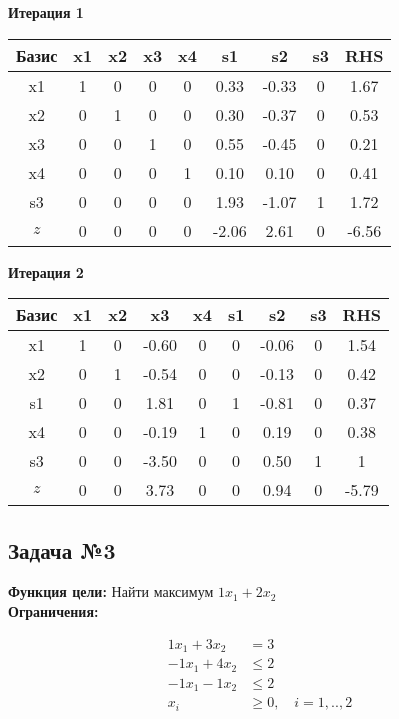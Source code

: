 \documentclass[a4paper,12pt]{article}
\begin{document}
 \textbf{Итерация 1}\\
\begin{tabular}{|c|c|c|c|c|c|c|c|c|}
\hline
Базис & x1 & x2 & x3 & x4 & s1 & s2 & s3 & RHS \\ \hline
x1 & 1 & 0 & 0 & 0 & 0.33 & -0.33 & 0 & 1.67 \\ \hline
x2 & 0 & 1 & 0 & 0 & 0.30 & -0.37 & 0 & 0.53 \\ \hline
x3 & 0 & 0 & 1 & 0 & 0.55 & -0.45 & 0 & 0.21 \\ \hline
x4 & 0 & 0 & 0 & 1 & 0.10 & 0.10 & 0 & 0.41 \\ \hline
s3 & 0 & 0 & 0 & 0 & 1.93 & -1.07 & 1 & 1.72 \\ \hline
$z$ & 0 & 0 & 0 & 0 & -2.06 & 2.61 & 0 & -6.56 \\ \hline
\end{tabular}
\vspace{5mm}

 \textbf{Итерация 2}\\
\begin{tabular}{|c|c|c|c|c|c|c|c|c|}
\hline
Базис & x1 & x2 & x3 & x4 & s1 & s2 & s3 & RHS \\ \hline
x1 & 1 & 0 & -0.60 & 0 & 0 & -0.06 & 0 & 1.54 \\ \hline
x2 & 0 & 1 & -0.54 & 0 & 0 & -0.13 & 0 & 0.42 \\ \hline
s1 & 0 & 0 & 1.81 & 0 & 1 & -0.81 & 0 & 0.37 \\ \hline
x4 & 0 & 0 & -0.19 & 1 & 0 & 0.19 & 0 & 0.38 \\ \hline
s3 & 0 & 0 & -3.50 & 0 & 0 & 0.50 & 1 & 1 \\ \hline
$z$ & 0 & 0 & 3.73 & 0 & 0 & 0.94 & 0 & -5.79 \\ \hline
\end{tabular}
\vspace{5mm}



\subsection*{Задача №3}
\textbf{Функция цели: }
Найти максимум $ 1x_{1} +2x_{2} $\\

\textbf{Ограничения:}

\[ \begin{aligned}
1x_{1} +3x_{2} &= 3 \\
-1x_{1} +4x_{2} &\le 2 \\
-1x_{1} -1x_{2} &\le 2 \\
x_i &\ge 0,\quad i=1,..,2\\
\end{aligned}\]
\end{document}
